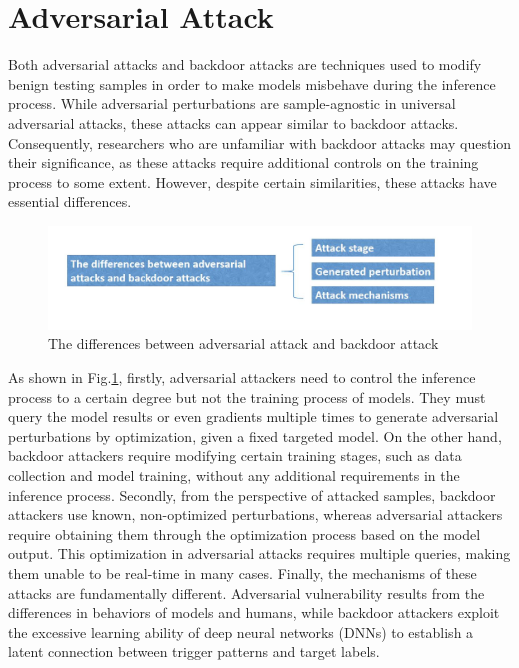 \documentclass[conference]{IEEEtran}
\begin{document}
\section{Adversarial Attack}  

Both adversarial attacks and backdoor attacks are techniques used to modify benign testing samples
in order to make models misbehave during the inference process. While adversarial perturbations are sample-agnostic in universal adversarial attacks,
these attacks can appear similar to backdoor attacks. Consequently, researchers who are unfamiliar with backdoor attacks may question their significance,
as these attacks require additional controls on the training process to some extent.
However, despite certain similarities, these attacks have essential differences.

\begin{figure}[htbp]
    \centerline{\includegraphics[width=0.8\linewidth,height=0.6\linewidth]{picture/diff.jpg}}
    \caption{The differences between adversarial attack and backdoor attack}
    \label{fig18}
\end{figure}

As shown in Fig.\ref{fig18}, firstly, adversarial attackers need to control the inference process to a certain degree
but not the training process of models. They must query the model results or even gradients multiple
times to generate adversarial perturbations by optimization, given a fixed targeted model.
On the other hand, backdoor attackers require modifying certain training stages,
such as data collection and model training, without any additional requirements in the inference process.
Secondly, from the perspective of attacked samples, backdoor attackers use known,
non-optimized perturbations, whereas adversarial attackers require obtaining
them through the optimization process based on the model output.
This optimization in adversarial attacks requires multiple queries,
making them unable to be real-time in many cases.
Finally, the mechanisms of these attacks are fundamentally different.
Adversarial vulnerability results from the differences in behaviors of models and humans,
while backdoor attackers exploit the excessive learning ability of deep neural networks (DNNs)
to establish a latent connection between trigger patterns and target labels.
\end{document}
